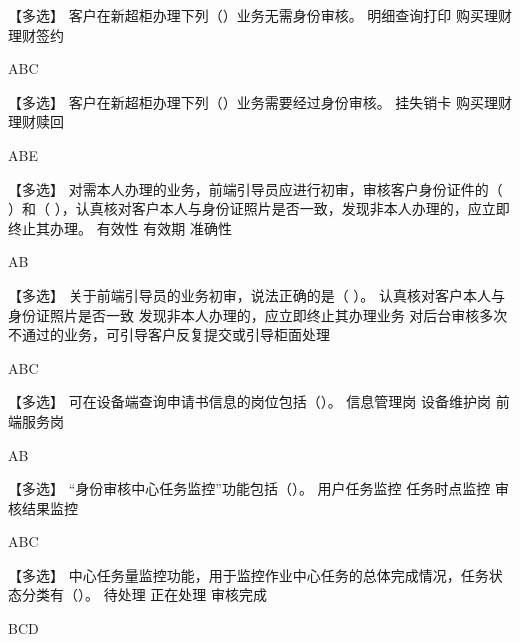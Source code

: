 \documentclass[kindlepaper]{BHCexam4kindle}
\begin{document}
\begin{questions}
\qs 【多选】 客户在新超柜办理下列（）业务无需身份审核。 \xx
{} {  明细查询打印 } { 购买理财 } { 理财签约 }
\begin{solution} ABC \end{solution}
\qs 【多选】 客户在新超柜办理下列（）业务需要经过身份审核。 \xx
{} {  挂失销卡 } { 购买理财 } { 理财赎回 }
\begin{solution} ABE \end{solution}
\qs 【多选】 对需本人办理的业务，前端引导员应进行初审，审核客户身份证件的（  ）和（  ），认真核对客户本人与身份证照片是否一致，发现非本人办理的，应立即终止其办理。 \xx
{} {  有效性 } { 有效期 } { 准确性 }
\begin{solution} AB \end{solution}
\qs 【多选】 关于前端引导员的业务初审，说法正确的是（  ）。 \xx
{} {  认真核对客户本人与身份证照片是否一致 } { 发现非本人办理的，应立即终止其办理业务 } { 对后台审核多次不通过的业务，可引导客户反复提交或引导柜面处理 }
\begin{solution} ABC \end{solution}
\qs 【多选】 可在设备端查询申请书信息的岗位包括（）。 \xx
{} {  信息管理岗 } { 设备维护岗 } { 前端服务岗 }
\begin{solution} AB \end{solution}
\qs 【多选】 “身份审核中心任务监控”功能包括（）。 \xx
{} {  用户任务监控 } { 任务时点监控 } { 审核结果监控 }
\begin{solution} ABC \end{solution}
\qs 【多选】 中心任务量监控功能，用于监控作业中心任务的总体完成情况，任务状态分类有（）。 \xx
{} {  待处理 } { 正在处理 } { 审核完成 }
\begin{solution} BCD \end{solution}

\end{questions}
\end{document}
